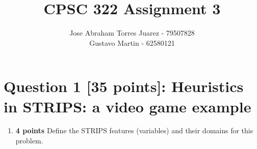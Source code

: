 \documentclass{article}
\begin{document}
\title{CPSC 322 Assignment 3}
\author{
    Jose Abraham Torres Juarez - 79507828 \\
    Gustavo Martin - 62580121
}
\date{}
\maketitle
\vspace{-2em}


\section{Question 1 [35 points]: Heuristics in STRIPS: a video game example}

\begin{enumerate}[label=(\alph*)]
    \item \textbf{4 points} Define the STRIPS features (variables) and their domains for this problem. \\
    

\end{enumerate}
\end{document}
